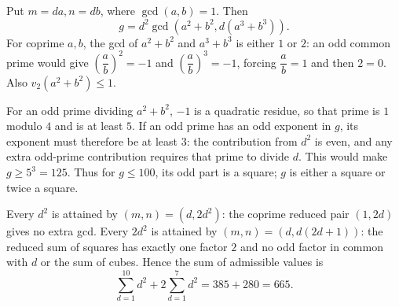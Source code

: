 Put $m=da,n=db$, where $\gcd(a,b)=1$. Then
\[
g=d^2\gcd(a^2+b^2,d(a^3+b^3)).
\]
For coprime $a,b$, the gcd of $a^2+b^2$ and $a^3+b^3$ is either $1$ or $2$: an odd common prime would give $(\dfrac{a}{b})^2=-1$ and $(\dfrac{a}{b})^3=-1$, forcing $\dfrac{a}{b}=1$ and then $2=0$. Also $v_2(a^2+b^2)\le1$.

For an odd prime dividing $a^2+b^2$, $-1$ is a quadratic residue, so that prime is $1$ modulo $4$ and is at least $5$. If an odd prime has an odd exponent in $g$, its exponent must therefore be at least $3$: the contribution from $d^2$ is even, and any extra odd-prime contribution requires that prime to divide $d$. This would make $g\ge5^3=125$. Thus for $g\le100$, its odd part is a square; $g$ is either a square or twice a square.

Every $d^2$ is attained by $(m,n)=(d,2d^2)$: the coprime reduced pair $(1,2d)$ gives no extra gcd. Every $2d^2$ is attained by $(m,n)=(d,d(2d+1))$: the reduced sum of squares has exactly one factor $2$ and no odd factor in common with $d$ or the sum of cubes. Hence the sum of admissible values is
\[
\sum_{d=1}^{10}d^2+2\sum_{d=1}^{7}d^2=385+280=\boxed{665}.
\]
